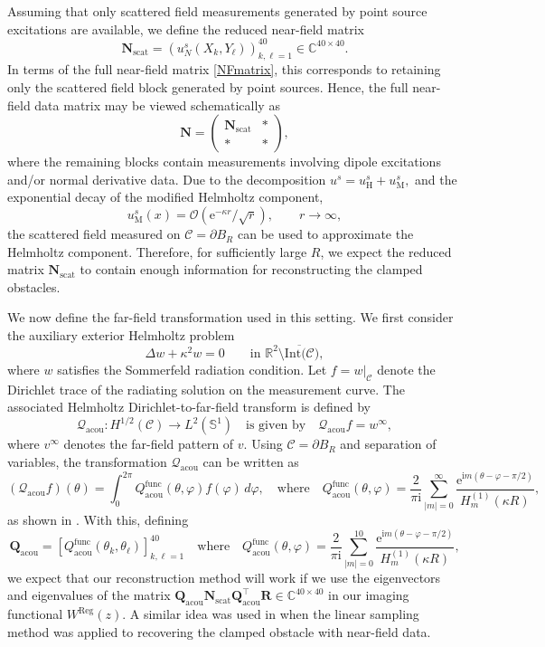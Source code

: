 \documentclass{article}
\begin{document}
Assuming that only scattered field measurements generated by point source excitations are available, we define the reduced near-field matrix
\[
\mathbf N_{\mathrm{scat}}
=
\left(
u_N^s(X_k,Y_\ell)
\right)_{k,\ell=1}^{40}
\in\mathbb C^{40\times40}.
\]
In terms of the full near-field matrix \eqref{NFmatrix}, this corresponds to
retaining only the scattered field block generated by point sources. Hence,
the full near-field data matrix may be viewed schematically as
\[
\mathbf N=
\begin{pmatrix}
\mathbf N_{\mathrm{scat}} & *\\
* & *
\end{pmatrix},
\]
where the remaining blocks contain measurements involving dipole excitations
and/or normal derivative data. Due to the decomposition $
u^s=u_{\mathrm H}^s+u_{\mathrm M}^s,
$
and the exponential decay of the modified Helmholtz component,
\[
u_{\mathrm M}^s(x)
=
\mathcal O\left(\mathrm e^{-\kappa r}/\sqrt{r}\right),
\qquad r\to\infty,
\]
the scattered field measured on $\mathcal C=\partial B_R$ can be used to approximate the
Helmholtz component. Therefore, for sufficiently large $R$, we expect the reduced matrix
$\mathbf N_{\mathrm{scat}}$ to contain enough information for reconstructing the clamped obstacles. 

We now define the far-field transformation used in this setting. We first consider the auxiliary exterior Helmholtz problem
\[
\Delta w+\kappa^2 w=0
\qquad\text{in }\mathbb R^2\setminus \overline{\text{Int}(\mathcal C}),
\]
where $w$ satisfies the Sommerfeld radiation condition. Let 
$
f=w|_{\mathcal C}$
denote the Dirichlet trace of the radiating solution on the measurement curve. The associated Helmholtz Dirichlet-to-far-field transform is defined by
\[
\mathcal Q_{\mathrm{acou}}:
H^{1/2}(\mathcal C)\rightarrow L^2(\mathbb S^1)\quad \text{is given by}\quad
\mathcal Q_{\mathrm{acou}}f=w^\infty,
\]
where $v^\infty$ denotes the far-field pattern of $v$. Using $\mathcal C=\partial B_R$ and separation of variables, the transformation
$\mathcal Q_{\mathrm{acou}}$ can be written as
\[
(\mathcal Q_{\mathrm{acou}}f)(\theta)
=
\int_0^{2\pi}
Q_{\mathrm{acou}}^{\mathrm{func}}(\theta,\varphi)f(\varphi)\,d\varphi,\quad \text{where}\quad Q_{\mathrm{acou}}^{\mathrm{func}}(\theta,\varphi)
=
\frac{2}{\pi \mathrm i}
\sum_{|m|=0}^{\infty}
\frac{\mathrm e^{\mathrm im(\theta-\varphi-\pi/2)}}
{H_m^{(1)}(\kappa R)},
\]
as shown in \cite{HarrisNyugens2022}. With this, defining 
\[
\mathbf Q_{\mathrm{acou}}=[Q_{\mathrm{acou}}^{\text{func}}(\theta_k,\theta_{\ell})]_{k,\ell=1}^{40}\quad \text{where}\quad Q_{\mathrm{acou}}^{\text{func}}(\theta,\varphi)=\frac{2}{\pi \mathrm i}
\sum_{|m|=0}^{10}
\frac{\mathrm e^{\mathrm im(\theta-\varphi-\pi/2)}}
{H_m^{(1)}(\kappa R)},
\]
we expect that our reconstruction method will work if we use the eigenvectors and eigenvalues of the matrix $\mathbf Q_{\mathrm{acou}}\mathbf N_{\mathrm{scat}}\mathbf Q_{\mathrm{acou}}^\top \mathbf R\in \mathbb C^{40\times 40}$ in our imaging functional $W^{\mathrm{Reg}}(z)$. A similar idea was used in \cite{BourgeoisRecoquillay2020} when the linear sampling method was applied to recovering the clamped obstacle with near-field data. 
\end{document}
